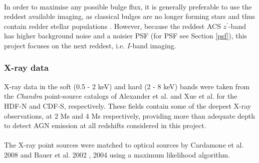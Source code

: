 \documentclass[11pt,twocolumn]{article}
\begin{document}
\paragraph{}  In order to  maximise any possible bulge flux, it is generally preferable to use the reddest available imaging, as classical bulges are no longer forming stars and thus contain redder stellar populations \cite{2004ARA&A..42..603K}. However, because the reddest ACS $z^\prime$-band  has higher background noise and a noisier PSF (for PSF see Section \ref{psf}), this project focuses on the next reddest, i.e. $I$-band imaging.


\subsubsection{\normalsize X-ray data}
X-ray data in the soft (0.5 - 2 keV) and hard (2 - 8 keV) bands were taken from the \emph{Chandra} point-source catalogs of Alexander et al. \cite{2003AJ....126..539A} and Xue et al. \cite{2011ApJS..195...10X} for the HDF-N and CDF-S, respectively. These  fields contain some of the deepest X-ray observations, at 2 Ms and 4 Ms respectively, providing more than adequate depth to detect AGN emission at all redshifts considered in this project. 
\paragraph{} The  X-ray point sources were matched to optical sources by Cardamone et al. 2008 \cite{2008ApJ...680..130C} and Bauer et al. 2002 \cite{2002AJ....124.2351B}, 2004 \cite{2004AJ....128.2048B} using a maximum likelihood algorithm. 
\end{document}
